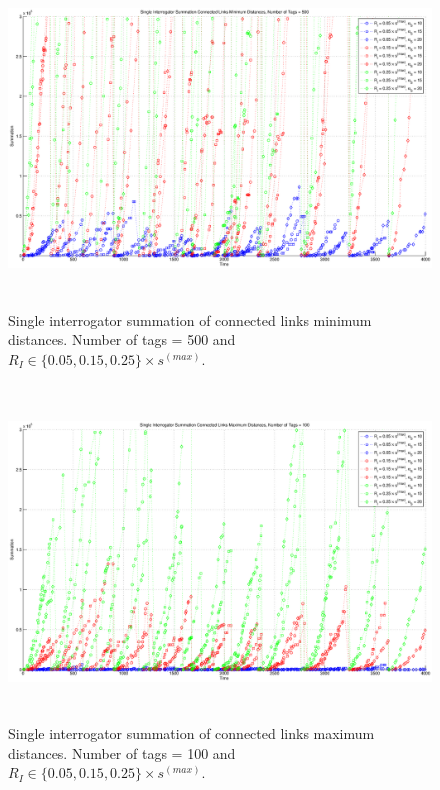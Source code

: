 \begin{figure}
\centering
\includegraphics[width=5in, height=3.5in]{Chapter_4_Figures/sin_min_500tags_all.eps}
\caption{Single interrogator summation of connected links minimum distances. Number of tags = 500 and $R_I \in \{0.05, 0.15, 0.25\} \times s^{(max)}$.}
\label{Figure: sin_min_500tags_all.eps}
\end{figure}
\begin{figure}
\centering
\includegraphics[width=5in, height=3.5in]{Chapter_4_Figures/sin_max_100tags_all.eps}
\caption{Single interrogator summation of connected links maximum distances. Number of tags = 100 and $R_I \in \{0.05, 0.15, 0.25\} \times s^{(max)}$.}
\label{Figure: sin_max_100tags_all.eps}
\end{figure}
\clearpage


